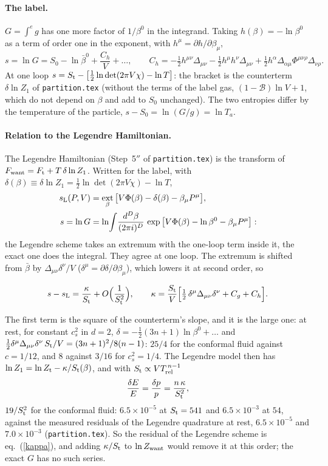 \documentclass[11pt,aps,preprint,nofootinbib,superscriptaddress,tightenlines]{revtex4-2}
\def\st{\begin{equation}}
\def\stp{\end{equation}}
\def\Eq#1{eq.~(\ref{#1})}
\let\oldparagraph\paragraph
\renewcommand{\paragraph}{\par\bigskip\oldparagraph}
\begin{document}
\paragraph{The label.}  $G=\int^eg$ has one more factor of $1/\beta^0$ in the integrand.  Taking $h(\beta)=-\ln\beta^0$ as a term of order one in the
exponent, with $h^\mu=\partial h/\partial\beta_\mu$,
\st
s=\ln G=S_0-\ln\bar\beta^0+\frac{C_h}V+\dots,\qquad
C_h=-\tfrac12h^{\mu\nu}\Delta_{\mu\nu}-\tfrac12h^\mu h^\nu\Delta_{\mu\nu}+\tfrac12h^\alpha\Delta_{\alpha\mu}\Phi^{\mu\nu\rho}\Delta_{\nu\rho} .
\label{Ch}
\stp
At one loop $s=S_{\rm t}-\big[\tfrac12\ln\det(2\pi V\chi)-\ln T\big]$: the bracket is the counterterm $\delta\ln Z_1$ of \nolinkurl{partition.tex}
(without the terms of the label gas, $(1-\mathcal B)\ln V+1$, which do not depend on $\beta$ and add to $S_0$ unchanged).  The two entropies differ by the temperature of the
particle, $s-S_0=\ln(G/g)=\ln T_a$.

\paragraph{Relation to the Legendre Hamiltonian.}  The Legendre Hamiltonian (Step~5$''$ of \nolinkurl{partition.tex}) is the transform of
$F_{\rm want}=F_{\rm t}+T\,\delta\ln Z_1$.  Written for the label, with $\delta(\beta)\equiv\delta\ln Z_1=\tfrac12\ln\det(2\pi V\chi)-\ln T$,
\begin{align}
s_{\rm L}(P,V)&=\mathop{\rm ext}_\beta\big[V\Phi(\beta)-\delta(\beta)-\beta_\mu P^\mu\big], \nonumber\\
s=\ln G&=\ln\!\int\!\frac{d^D\beta}{(2\pi i)^D}\,\exp\big[V\Phi(\beta)-\ln\beta^0-\beta_\mu P^\mu\big] :
\end{align}
the Legendre scheme takes an extremum with the one-loop term inside it, the exact one does the integral.  They agree at one loop.  The extremum
is shifted from $\bar\beta$ by $\Delta_{\mu\nu}\delta^\nu/V$ ($\delta^\mu=\partial\delta/\partial\beta_\mu$), which lowers it at second order, so
\begin{keyeq}
\st
s-s_{\rm L}=\frac\kappa{S_{\rm t}}+O\Big(\frac1{S_{\rm t}^2}\Big),\qquad
\kappa=\frac{S_{\rm t}}V\Big[\tfrac12\,\delta^\mu\Delta_{\mu\nu}\delta^\nu+C_g+C_h\Big] .
\label{kappa}
\stp
\end{keyeq}
The first term is the square of the counterterm's slope, and it is the large one: at rest, for constant $c_s^2$ in $d=2$, $\delta=-\tfrac12(3n+1)\ln\beta^0+\dots$ and
$\tfrac12\delta^\mu\Delta_{\mu\nu}\delta^\nu\,S_{\rm t}/V=(3n+1)^2/8(n-1)$: $25/4$ for the conformal fluid against $c=1/12$, and $8$ against $3/16$
for $c_s^2=1/4$.  The Legendre model then has $\ln Z_1=\ln Z_{\rm t}-\kappa/S_{\rm t}(\beta)$, and with $S_{\rm t}\propto VT_{\rm rel}^{\,n-1}$
\st
\frac{\delta E}E=\frac{\delta p}p=\frac{n\,\kappa}{S_{\rm t}^2} ,
\stp
$19/S_{\rm t}^2$ for the conformal fluid: $6.5\times10^{-5}$ at $S_{\rm t}=541$ and $6.5\times10^{-3}$ at $54$, against the measured residuals of
the Legendre quadrature at rest, $6.5\times10^{-5}$ and $7.0\times10^{-3}$ (\nolinkurl{partition.tex}).  So the residual of the Legendre scheme is
\Eq{kappa}, and adding $\kappa/S_{\rm t}$ to $\ln Z_{\rm want}$ would remove it at this order; the exact $G$ has no such series.
\end{document}

